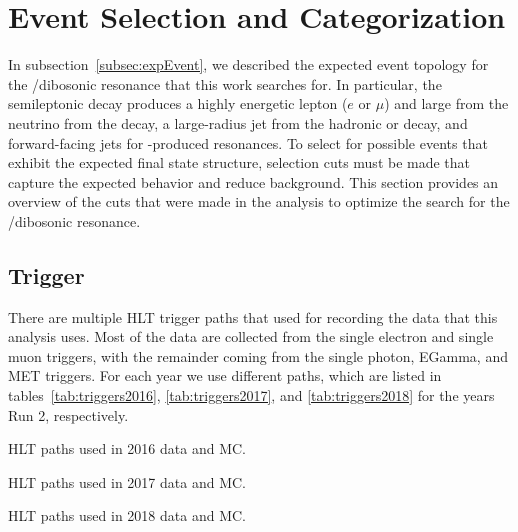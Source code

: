 
\section{Event Selection and Categorization}
\label{sec:events}

In subsection~\ref{subsec:expEvent}, we described the expected event topology for the \WV/\WH dibosonic resonance that this work searches for.
In particular, the semileptonic decay produces a highly energetic lepton ($e$ or $\mu$) and large \Etmiss from the neutrino from the \Wtolnu decay, a large-radius jet from the hadronic \Vtoqqbarpr or \Htobbbar decay, and forward-facing \VBF jets for \VBF-produced resonances.
To select for possible events that exhibit the expected final state structure, selection cuts must be made that capture the expected behavior and reduce background.
This section provides an overview of the cuts that were made in the analysis to optimize the search for the \WV/\WH dibosonic resonance.

\subsection{Trigger}

There are multiple HLT trigger paths that used for recording the data that this analysis uses.
Most of the data are collected from the single electron and single muon triggers, with the remainder coming from the single photon, EGamma, and MET triggers.
For each year we use different paths, which are listed in tables~\ref{tab:triggers2016}, \ref{tab:triggers2017}, and \ref{tab:triggers2018} for the years Run 2, respectively.

\begin{table}[htbp]
  \centering
  
  \caption{
    HLT paths used in 2016 data and MC.
  }
  \label{tab:triggers2016}
\end{table}

\begin{table}[htbp]
  \centering
  
  \caption{
    HLT paths used in 2017 data and MC.
  }
  \label{tab:triggers2017}
\end{table}

\begin{table}[htbp]
  \centering
  
  \caption{
    HLT paths used in 2018 data and MC.
  }
  \label{tab:triggers2018}
\end{table}

